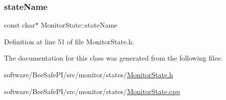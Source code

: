 \subsubsection{\texorpdfstring{state\+Name}{stateName}}
{\footnotesize\ttfamily const char$\ast$ Monitor\+State\+::state\+Name\hspace{0.3cm}{\ttfamily [protected]}}



Definition at line 51 of file Monitor\+State.\+h.



The documentation for this class was generated from the following files\+:\begin{DoxyCompactItemize}
\item 
software/\+Bee\+Safe\+P\+I/src/monitor/states/\hyperlink{_monitor_state_8h}{Monitor\+State.\+h}\item 
software/\+Bee\+Safe\+P\+I/src/monitor/states/\hyperlink{_monitor_state_8cpp}{Monitor\+State.\+cpp}\end{DoxyCompactItemize}

